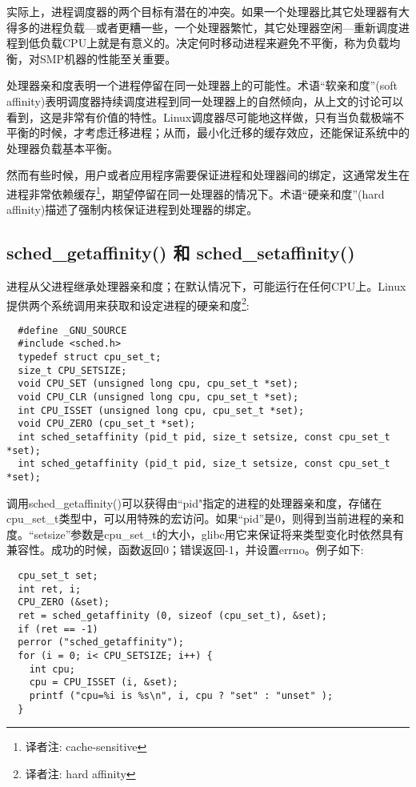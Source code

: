 实际上，进程调度器的两个目标有潜在的冲突。如果一个处理器比其它处理器有大得多的进程负载---或者更糟一些，一个处理器繁忙，其它处理器空闲---重新调度进程到低负载CPU上就是有意义的。决定何时移动进程来避免不平衡，称为负载均衡，对SMP机器的性能至关重要。

处理器亲和度表明一个进程停留在同一处理器上的可能性。术语“软亲和度”(soft affinity)表明调度器持续调度进程到同一处理器上的自然倾向，从上文的讨论可以看到，这是非常有价值的特性。Linux调度器尽可能地这样做，只有当负载极端不平衡的时候，才考虑迁移进程；从而，最小化迁移的缓存效应，还能保证系统中的处理器负载基本平衡。

然而有些时候，用户或者应用程序需要保证进程和处理器间的绑定，这通常发生在进程非常依赖缓存\footnote[3]{译者注: cache-sensitive}，期望停留在同一处理器的情况下。术语“硬亲和度”(hard affinity)描述了强制内核保证进程到处理器的绑定。

\subsection{sched\_getaffinity() 和 sched\_setaffinity()}

进程从父进程继承处理器亲和度；在默认情况下，可能运行在任何CPU上。Linux提供两个系统调用来获取和设定进程的硬亲和度\footnote[3]{译者注: hard affinity}:

\begin{lstlisting}
  #define _GNU_SOURCE
  #include <sched.h>
  typedef struct cpu_set_t;
  size_t CPU_SETSIZE;
  void CPU_SET (unsigned long cpu, cpu_set_t *set);
  void CPU_CLR (unsigned long cpu, cpu_set_t *set);
  int CPU_ISSET (unsigned long cpu, cpu_set_t *set);
  void CPU_ZERO (cpu_set_t *set);
  int sched_setaffinity (pid_t pid, size_t setsize, const cpu_set_t *set);
  int sched_getaffinity (pid_t pid, size_t setsize, const cpu_set_t *set);
\end{lstlisting}

调用sched\_getaffinity()可以获得由``pid"指定的进程的处理器亲和度，存储在cpu\_set\_t类型中，可以用特殊的宏访问。如果“pid”是0，则得到当前进程的亲和度。“setsize”参数是cpu\_set\_t的大小，glibc用它来保证将来类型变化时依然具有兼容性。成功的时候，函数返回0；错误返回-1，并设置errno。例子如下:

\begin{lstlisting}
  cpu_set_t set;
  int ret, i;
  CPU_ZERO (&set);
  ret = sched_getaffinity (0, sizeof (cpu_set_t), &set);
  if (ret == -1)
  perror ("sched_getaffinity");
  for (i = 0; i< CPU_SETSIZE; i++) {
    int cpu;
    cpu = CPU_ISSET (i, &set);
    printf ("cpu=%i is %s\n", i, cpu ? "set" : "unset" );
  }
\end{lstlisting}

